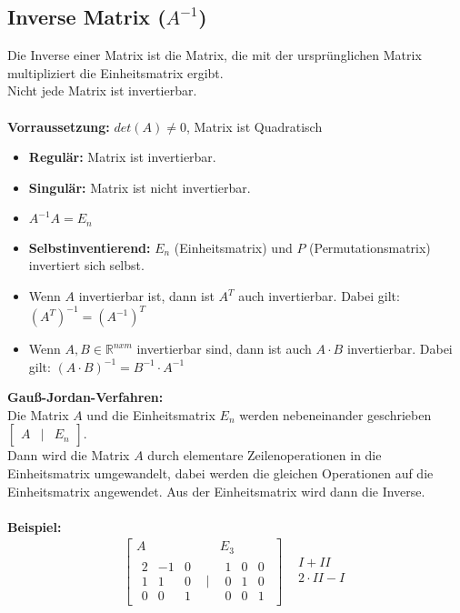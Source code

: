 \documentclass[12pt,a4paper]{article}
\begin{document}
\subsection{Inverse Matrix ($A^{-1}$)}
Die Inverse einer Matrix ist die Matrix, die mit der ursprünglichen Matrix multipliziert die Einheitsmatrix ergibt. \\
Nicht jede Matrix ist invertierbar. \\ \\
\textbf{Vorraussetzung:} $det(A) \neq 0$, Matrix ist Quadratisch \\
\begin{itemize}
    \item \textbf{Regulär:} Matrix ist invertierbar.
    \item \textbf{Singulär:} Matrix ist nicht invertierbar.
    \item $A^{-1}A=E_n$
    \item \textbf{Selbstinventierend:} $E_n$ (Einheitsmatrix) und $P$ (Permutationsmatrix) invertiert sich selbst.
    \item Wenn $A$ invertierbar ist, dann ist $A^T$ auch invertierbar. Dabei gilt: $(A^T)^{-1} = (A^{-1})^T$
    \item Wenn $A, B \in \mathbb{R}^{nxm} $ invertierbar sind, dann ist auch $A \cdot B$ invertierbar. Dabei gilt: $(A \cdot B)^{-1} = B^{-1} \cdot A^{-1}$
\end{itemize}
\textbf{Gauß-Jordan-Verfahren:} \\
Die Matrix $A$ und die Einheitsmatrix $E_n$ werden nebeneinander geschrieben $\begin{bmatrix}A & \vert & E_n\end{bmatrix}$. \\
Dann wird die Matrix $A$ durch elementare Zeilenoperationen in die Einheitsmatrix umgewandelt, dabei werden die gleichen Operationen auf die Einheitsmatrix angewendet. Aus der Einheitsmatrix wird dann die Inverse. \\ \\
\newpage
\textbf{Beispiel:}
\[
\begin{matrix}
    \begin{bmatrix}
        A && E_3\\
        \begin{matrix}
            2 & -1 & 0 \\
            1 & 1 & 0 \\
            0 & 0 & 1
        \end{matrix} & \vert &
        \begin{matrix}
            1 & 0 & 0 \\
            0 & 1 & 0 \\
            0 & 0 & 1
        \end{matrix}
    \end{bmatrix}
    &
    \begin{matrix}
        I + II \\
        2 \cdot II - I \\
    \end{matrix}
\end{matrix}
\]
\end{document}
